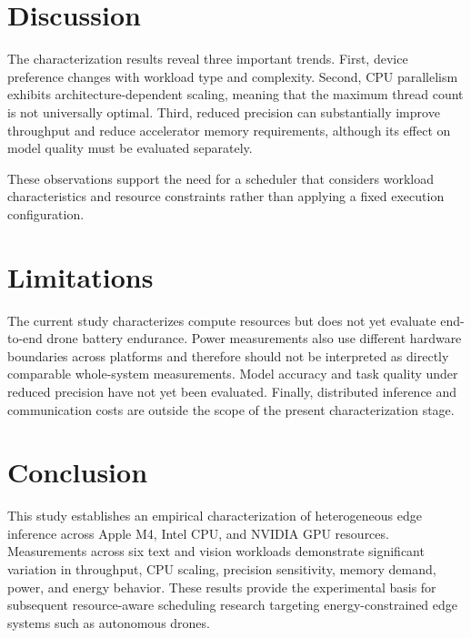 \documentclass[conference]{IEEEtran}
\begin{document}
\section{Discussion}

The characterization results reveal three important trends. First, device preference changes with workload type and complexity. Second, CPU parallelism exhibits architecture-dependent scaling, meaning that the maximum thread count is not universally optimal. Third, reduced precision can substantially improve throughput and reduce accelerator memory requirements, although its effect on model quality must be evaluated separately.

These observations support the need for a scheduler that considers workload characteristics and resource constraints rather than applying a fixed execution configuration.

\section{Limitations}

The current study characterizes compute resources but does not yet evaluate end-to-end drone battery endurance. Power measurements also use different hardware boundaries across platforms and therefore should not be interpreted as directly comparable whole-system measurements. Model accuracy and task quality under reduced precision have not yet been evaluated. Finally, distributed inference and communication costs are outside the scope of the present characterization stage.

\section{Conclusion}

This study establishes an empirical characterization of heterogeneous edge inference across Apple M4, Intel CPU, and NVIDIA GPU resources. Measurements across six text and vision workloads demonstrate significant variation in throughput, CPU scaling, precision sensitivity, memory demand, power, and energy behavior. These results provide the experimental basis for subsequent resource-aware scheduling research targeting energy-constrained edge systems such as autonomous drones.



\end{document}
